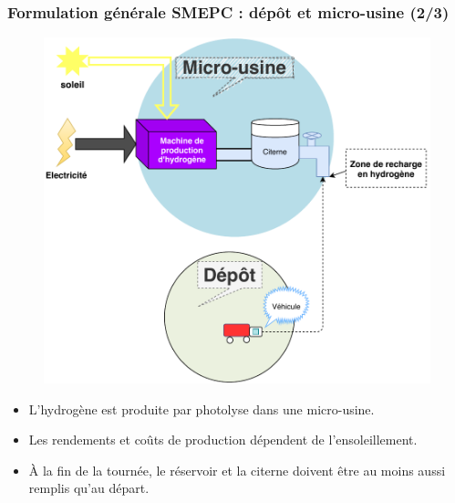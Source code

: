 \documentclass[hyperref={bookmarks=false},aspectratio=169]{beamer}
\begin{document}

\begin{frame}
\frametitle{Formulation générale SMEPC : dépôt et micro-usine (2/3)}



\begin{minipage}{.50\textwidth}%
\begin{figure}
    \centering
    \includegraphics[width=\textwidth]{./figures/illustration_depotrond.pdf}%
    \label{fig:dept}
\end{figure}

\end{minipage}%
\hfill
\begin{minipage}{.5\textwidth}%
\begin{itemize}
 
    \item L'hydrogène est produite par photolyse dans une micro-usine.
    \space
    \item Les rendements et coûts de production dépendent de l'ensoleillement.
    \space
    \item \`{A} la fin de la tournée, le réservoir et la citerne doivent être au moins aussi remplis qu'au départ.
\end{itemize}   
    

\end{minipage}
\end{frame}
\end{document}

